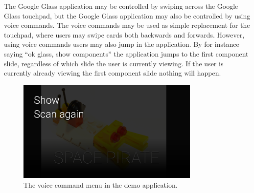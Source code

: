 The Google Glass application may be controlled by swiping across the Google Glass touchpad, but the Google Glass application may also be controlled by using voice commands. The voice commands may be used as simple replacement for the touchpad, where users may swipe cards both backwards and forwards. However, using voice commands users may also jump in the application. By for instance saying ``ok glass, show components'' the application jumps to the first component slide, regardless of which slide the user is currently viewing. If the user is currently already viewing the first component slide nothing will happen.
	
	\begin{figure}[ht!]
		\centering
		\includegraphics[width=90mm]{images/demo/voiceCommand1}
		\caption{The voice command menu in the demo application.}
		\label{glassDemoVoiceCommand}
	\end{figure}


